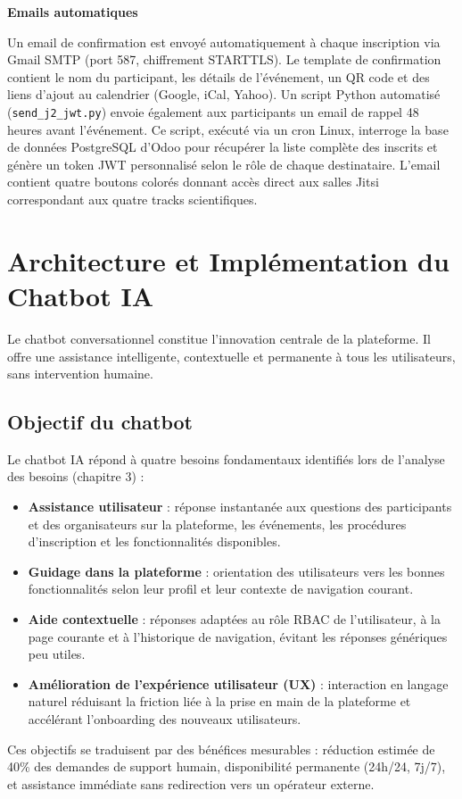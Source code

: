\textbf{Emails automatiques}

Un email de confirmation est envoyé automatiquement à chaque inscription via Gmail SMTP (port 587, chiffrement STARTTLS). Le template de confirmation contient le nom du participant, les détails de l'événement, un QR code et des liens d'ajout au calendrier (Google, iCal, Yahoo). Un script Python automatisé (\texttt{send\_j2\_jwt.py}) envoie également aux participants un email de rappel 48 heures avant l'événement. Ce script, exécuté via un cron Linux, interroge la base de données PostgreSQL d'Odoo pour récupérer la liste complète des inscrits et génère un token JWT personnalisé selon le rôle de chaque destinataire. L'email contient quatre boutons colorés donnant accès direct aux salles Jitsi correspondant aux quatre tracks scientifiques.

\section{Architecture et Implémentation du Chatbot IA}

Le chatbot conversationnel constitue l'innovation centrale de la plateforme. Il offre une assistance intelligente, contextuelle et permanente à tous les utilisateurs, sans intervention humaine.

\subsection{Objectif du chatbot}
Le chatbot IA répond à quatre besoins fondamentaux identifiés lors de l'analyse des besoins (chapitre 3) :
\begin{itemize}
    \item \textbf{Assistance utilisateur} : réponse instantanée aux questions des participants et des organisateurs sur la plateforme, les événements, les procédures d'inscription et les fonctionnalités disponibles.
    \item \textbf{Guidage dans la plateforme} : orientation des utilisateurs vers les bonnes fonctionnalités selon leur profil et leur contexte de navigation courant.
    \item \textbf{Aide contextuelle} : réponses adaptées au rôle RBAC de l'utilisateur, à la page courante et à l'historique de navigation, évitant les réponses génériques peu utiles.
    \item \textbf{Amélioration de l'expérience utilisateur (UX)} : interaction en langage naturel réduisant la friction liée à la prise en main de la plateforme et accélérant l'onboarding des nouveaux utilisateurs.
\end{itemize}
Ces objectifs se traduisent par des bénéfices mesurables : réduction estimée de 40\% des demandes de support humain, disponibilité permanente (24h/24, 7j/7), et assistance immédiate sans redirection vers un opérateur externe.

